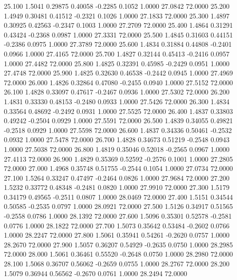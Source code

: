   25.100   1.5041   0.29875   0.40058  -0.2285   0.1052   1.0000  27.0842  72.0000
  25.200   1.4949   0.30481   0.41512  -0.2321   0.1026   1.0000  27.1833  72.0000
  25.300   1.4897   0.30925   0.42563  -0.2347   0.1003   1.0000  27.2709  72.0000
  25.400   1.4864   0.31291   0.43424  -0.2368   0.0987   1.0000  27.3331  72.0000
  25.500   1.4845   0.31603   0.44151  -0.2386   0.0975   1.0000  27.3789  72.0000
  25.600   1.4834   0.31884   0.44808  -0.2401   0.0966   1.0000  27.4165  72.0000
  25.700   1.4827   0.32144   0.45413  -0.2416   0.0957   1.0000  27.4482  72.0000
  25.800   1.4825   0.32391   0.45985  -0.2429   0.0951   1.0000  27.4748  72.0000
  25.900   1.4825   0.32630   0.46538  -0.2442   0.0945   1.0000  27.4969  72.0000
  26.000   1.4826   0.32864   0.47080  -0.2455   0.0940   1.0000  27.5152  72.0000
  26.100   1.4828   0.33097   0.47617  -0.2467   0.0936   1.0000  27.5302  72.0000
  26.200   1.4831   0.33330   0.48153  -0.2480   0.0933   1.0000  27.5426  72.0000
  26.300   1.4834   0.33564   0.48692  -0.2492   0.0931   1.0000  27.5525  72.0000
  26.400   1.4837   0.33803   0.49242  -0.2504   0.0929   1.0000  27.5591  72.0000
  26.500   1.4839   0.34055   0.49821  -0.2518   0.0929   1.0000  27.5598  72.0000
  26.600   1.4837   0.34336   0.50461  -0.2532   0.0932   1.0000  27.5478  72.0000
  26.700   1.4828   0.34673   0.51219  -0.2548   0.0943   1.0000  27.5038  72.0000
  26.800   1.4819   0.35046   0.52018  -0.2565   0.0967   1.0000  27.4113  72.0000
  26.900   1.4829   0.35369   0.52592  -0.2576   0.1001   1.0000  27.2805  72.0000
  27.000   1.4968   0.35748   0.51755  -0.2544   0.1054   1.0000  27.0734  72.0000
  27.100   1.5264   0.33247   0.47497  -0.2464   0.0826   1.0000  27.9684  72.0000
  27.200   1.5232   0.33772   0.48348  -0.2481   0.0820   1.0000  27.9910  72.0000
  27.300   1.5179   0.34179   0.49565  -0.2511   0.0807   1.0000  28.0469  72.0000
  27.400   1.5151   0.34544   0.50585  -0.2535   0.0797   1.0000  28.0921  72.0000
  27.500   1.5126   0.34917   0.51565  -0.2558   0.0786   1.0000  28.1392  72.0000
  27.600   1.5096   0.35301   0.52578  -0.2581   0.0776   1.0000  28.1822  72.0000
  27.700   1.5073   0.35642   0.53484  -0.2602   0.0766   1.0000  28.2247  72.0000
  27.800   1.5061   0.35941   0.54261  -0.2620   0.0757   1.0000  28.2670  72.0000
  27.900   1.5057   0.36207   0.54929  -0.2635   0.0750   1.0000  28.2985  72.0000
  28.000   1.5061   0.36461   0.55520  -0.2648   0.0750   1.0000  28.2980  72.0000
  28.100   1.5068   0.36707   0.56062  -0.2659   0.0755   1.0000  28.2767  72.0000
  28.200   1.5079   0.36944   0.56562  -0.2670   0.0761   1.0000  28.2494  72.0000
